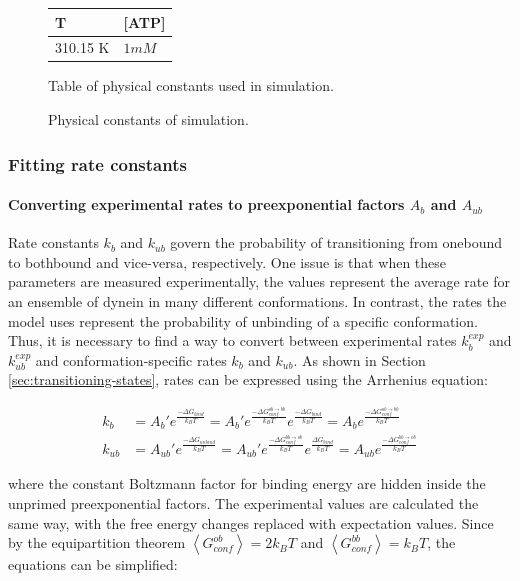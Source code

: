 \documentclass[10pt]{article} %
\begin{document}
\begin{figure}[h]
  \centering
  \begin{tabular}{| l | l |}
    \hline
    T & [ATP] \\ \hline
    310.15 K & $1mM$\\ \hline
  \end{tabular}
  \caption{Physical constants of simulation.}{Table of physical constants used in simulation.}
  \label{table:simulation-std-conditions}
\end{figure}

\subsubsection{Fitting rate constants}
\paragraph{Converting experimental rates to preexponential factors $A_b$ and $A_{ub}$}
Rate constants $k_b$ and $k_{ub}$ govern the probability of transitioning from onebound to bothbound and vice-versa, respectively. One issue is that when these parameters are measured experimentally, the values represent the average rate for an ensemble of dynein in many different conformations. In contrast, the rates the model uses represent the probability of unbinding of a specific conformation. Thus, it is necessary to find a way to convert between experimental rates $k_b^{exp}$ and $k_{ub}^{exp}$ and conformation-specific rates $k_b$ and $k_{ub}$. As shown in Section \ref{sec:transitioning-states}, rates can be expressed using the Arrhenius equation:

\begin{align*}
  k_b &= A_b'e^{\frac{-\Delta G_{bind}}{k_BT}} = A_b'e^{\frac{-\Delta G_{conf}^{ob\rightarrow bb}}{k_BT}}e^{\frac{-\Delta G_{bind}}{k_BT}} = A_be^{\frac{-\Delta G_{conf}^{ob\rightarrow bb}}{k_BT}}\\
  k_{ub} &= A_{ub}'e^{\frac{-\Delta G_{unbind}}{k_BT}} = A_{ub}'e^{\frac{-\Delta G_{conf}^{bb\rightarrow ob}}{k_BT}}e^{\frac{\Delta G_{bind}}{k_BT}} = A_{ub}e^{\frac{-\Delta G_{conf}^{bb\rightarrow ob}}{k_BT}}
\end{align*}

where the constant Boltzmann factor for binding energy are hidden inside the unprimed preexponential factors. The experimental values are calculated the same way, with the free energy changes replaced with expectation values. Since by the equipartition theorem $\left<G_{conf}^{ob}\right> = 2k_BT$ and $\left<G_{conf}^{bb}\right> = k_BT$, the equations can be simplified:
\end{document}
